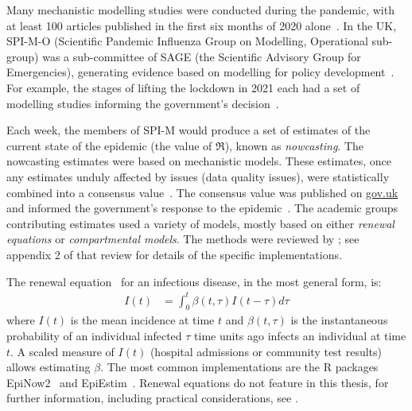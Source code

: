 \documentclass[thesis.tex]{subfiles}
\begin{document}
Many mechanistic modelling studies were conducted during the pandemic, with at least 100 articles published in the first six months of 2020 alone~\autocite{shankarSystematic}.
In the UK, SPI-M-O (Scientific Pandemic Influenza Group on Modelling, Operational sub-group) was a sub-committee of SAGE (the Scientific Advisory Group for Emergencies), generating evidence based on modelling for policy development~\autocite{medleySPIM,govSPIMO}.
For example, the stages of lifting the lockdown in 2021 each had a set of modelling studies informing the government's decision~\autocite{sageEvidence}.

Each week, the members of SPI-M would produce a set of estimates of the current state of the epidemic (\eg the value of $\Re$), known as \emph{nowcasting}.
The nowcasting estimates were based on mechanistic models.
These estimates, once any estimates unduly affected by issues (\eg data quality issues), were statistically combined into a consensus value~\autocite{parkCombining}.
The consensus value was published on \url{gov.uk} and informed the government's response to the epidemic~\autocite{govRnumber}.
The academic groups contributing estimates used a variety of models, mostly based on either \emph{renewal equations} or \emph{compartmental models}.
The methods were reviewed by \textcite{royalSocietyRnumber}; see appendix 2 of that review for details of the specific implementations.

The renewal equation~\autocite{fraserRenewal} for an infectious disease, in the most general form, is:
\begin{align}
    I(t) &= \int_{0}^{t} \beta(t,\tau) I(t-\tau) d \tau
\end{align}
where $I(t)$ is the mean incidence at time $t$ and $\beta(t, \tau)$ is the instantaneous probability of an individual infected $\tau$ time units ago infects an individual at time $t$.
A scaled measure of $I(t)$ (\eg hospital admissions or community test results) allows estimating $\beta$.
The most common implementations are the R packages EpiNow2~\autocite{EpiNow2} and EpiEstim~\autocite{EpiEstim}.
Renewal equations do not feature in this thesis, for further information, including practical considerations, see \textcite{nashEstimating,gosticPractical}.
\end{document}
